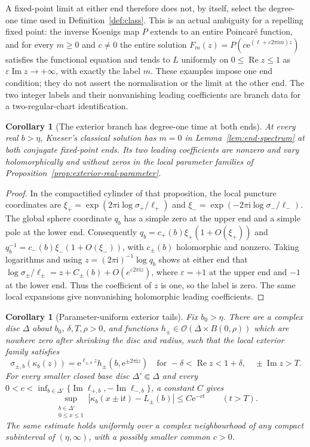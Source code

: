 \documentclass[11pt,a4paper]{article}
\newtheorem{corollary}[theorem]{Corollary}
\theoremstyle{definition}
\newcommand{\eee}{\mathrm{e}}
\newcommand{\ii}{\mathrm{i}}
\begin{document}
A fixed-point limit at either end therefore does not, by itself,
select the degree-one time used in Definition~\ref{def:class}.
This is an actual ambiguity for a repelling fixed point: the inverse
Koenigs map $P$ extends to an entire Poincar\'e function, and for every
$m\ge0$ and $c\ne0$ the entire solution
$F_m(z)=P(c\eee^{(\ell+\varepsilon2\pi\ii m)z})$ satisfies the
functional equation and tends to $L$ uniformly on
$0\le\operatorname{Re}z\le1$ as
$\varepsilon\operatorname{Im}z\to+\infty$, with exactly the label $m$.
These examples impose one end condition; they do not assert the
normalisation or the limit at the other end.  The two integer labels
and their nonvanishing leading coefficients are branch data for a
two-regular-chart identification.

\begin{corollary}[The exterior branch has degree-one time at both ends]
\label{cor:exterior-end-labels}
At every real $b>\eta$, Kneser's classical solution has $m=0$ in
Lemma~\ref{lem:end-spectrum} at both conjugate fixed-point ends.
Its two leading coefficients are nonzero and vary holomorphically
and without zeros in the local parameter families of
Proposition~\ref{prop:exterior-real-parameter}.
\end{corollary}

\begin{proof}
In the compactified cylinder of that proposition, the local puncture
coordinates are
$\xi_+=\exp(2\pi\ii\log\sigma_+/\ell_+)$ and
$\xi_-=\exp(-2\pi\ii\log\sigma_-/\ell_-)$.  The global sphere
coordinate $q_b$ has a simple zero at the upper end and a simple pole
at the lower end.  Consequently
$q_b=c_+(b)\xi_+(1+O(\xi_+))$ and
$q_b^{-1}=c_-(b)\xi_-(1+O(\xi_-))$, with $c_\pm(b)$ holomorphic and
nonzero.  Taking logarithms and using
$z=(2\pi\ii)^{-1}\log q_b$ shows at either end that
$\log\sigma_\pm/\ell_\pm=z+C_\pm(b)+O(e^{\varepsilon2\pi\ii z})$,
where $\varepsilon=+1$ at the upper end and $-1$ at the lower end.
Thus the coefficient of $z$ is one, so the label is zero.  The same
local expansions give nonvanishing holomorphic leading coefficients.
\end{proof}

\begin{corollary}[Parameter-uniform exterior tails]
\label{cor:exterior-uniform-tails}
Fix $b_0>\eta$.  There are a complex disc $\Delta$ about $b_0$,
$\delta,T,\rho>0$, and functions
$h_\pm\in\mathcal O(\Delta\times B(0,\rho))$ which are nowhere zero
after shrinking the disc and radius, such that the local exterior
family satisfies
\[
 \sigma_{\pm,b}(\kappa_b(z))
   =\eee^{\ell_{\pm,b}z}
      h_\pm(b,\eee^{\pm2\pi\ii z})
 \quad\text{for }-\delta<\operatorname{Re}z<1+\delta,
       \quad\pm\operatorname{Im}z>T.
\]
For every smaller closed base disc $\Delta'\Subset\Delta$ and every
$0<c<\inf_{b\in\Delta'}\{\operatorname{Im}\ell_{+,b},
-\operatorname{Im}\ell_{-,b}\}$, a constant $C$ gives
\[
 \sup_{\substack{b\in\Delta'\\0\le x\le1}}
 |\kappa_b(x\pm\ii t)-L_\pm(b)|\le C\eee^{-ct}
 \qquad(t>T).
\]
The same estimate holds uniformly over a complex neighbourhood of
any compact subinterval of $(\eta,\infty)$, with a possibly smaller
common $c>0$.
\end{corollary}
\end{document}
